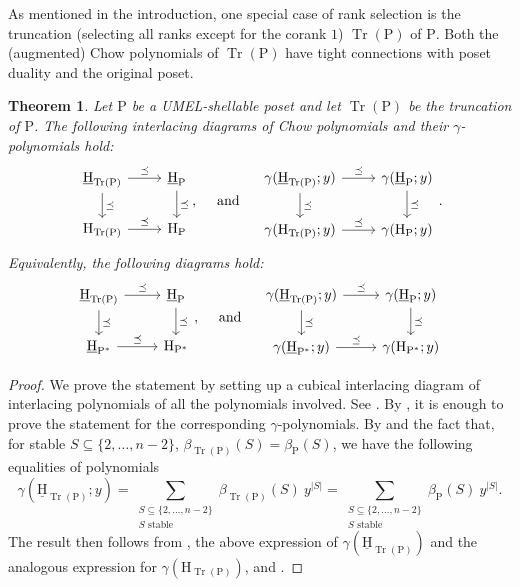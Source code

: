 \documentclass[11pt,a4paper]{amsart}
\theoremstyle{results}
\newtheorem{thm}{Theorem}[section]
\theoremstyle{definitions}
\def\P{\mathbb{P}}
\newcommand{\abs}[1]{\left\lvert#1\right\rvert}
\newcommand{\uH}{\underline{\mathrm{H}}}
\newcommand{\Tr}{\operatorname{Tr}}
\renewcommand{\P}{\mathrm{P}}
\renewcommand{\H}{\mathrm{H}}
\begin{document}
As mentioned in the introduction, one special case of rank selection is the truncation (selecting all ranks except for the corank $1$) $\Tr(\P)$ of $\P$. Both the (augmented) Chow polynomials of $\Tr(\P)$ have tight connections with poset duality and the original poset.
\begin{thm}\label{thm:gamma-truncation-interlacing}
    Let $\P$ be a UMEL-shellable poset and let $\Tr(\P)$ be the truncation of $\P$. 
    The following interlacing diagrams of Chow polynomials and their $\gamma$-polynomials hold: 
    \[
    \begin{tikzcd}
    \uH_{\Tr(\P)} \arrow[r, "\preceq"] \arrow[d, "\preceq"] & \uH_{\P} \arrow[d, "\preceq"] \\
     \H_{\Tr(\P)} \arrow[r, "\preceq"] & \H_{\P}
    \end{tikzcd}, \quad \text{ and } \quad \begin{tikzcd}
    \gamma(\uH_{\Tr(\P)}; y) \arrow[r, "\preceq"] \arrow[d, "\preceq"] & \gamma(\uH_{\P}; y) \arrow[d, "\preceq"] \\
     \gamma(\H_{\Tr(\P)}; y) \arrow[r, "\preceq"] & \gamma(\H_{\P}; y)
    \end{tikzcd}.
    \]
    Equivalently, the following diagrams hold: 
    \[
    \begin{tikzcd}
    \uH_{\Tr(\P)} \arrow[r, "\preceq"] \arrow[d, "\preceq"] & \uH_{\P} \arrow[d, "\preceq"] \\
    \uH_{\P^{\ast}} \arrow[r, "\preceq"] & \H_{\P^{\ast}}
    \end{tikzcd}, \quad \text{ and } \quad 
    \begin{tikzcd}
    \gamma(\uH_{\Tr(\P)}; y) \arrow[r, "\preceq"] \arrow[d, "\preceq"] & \gamma(\uH_{\P};y) \arrow[d, "\preceq"] \\
    \gamma(\uH_{\P^{\ast}};y) \arrow[r, "\preceq"] & \gamma(\H_{\P^{\ast}};y)
    \end{tikzcd}
    \]
\end{thm}

\begin{proof}
    We prove the statement by setting up a cubical interlacing diagram of interlacing polynomials of all the polynomials involved. See . By , it is enough to prove the statement for the corresponding $\gamma$-polynomials. 
    By  and the fact that, for stable $S \subseteq \{2, \ldots, n-2\}$, $\beta_{\Tr(\P)}(S) = \beta_{\P}(S)$, we have the following equalities of polynomials 
    \[
    \gamma(\uH_{\Tr(\P)}; y) = \sum_{\substack{S \subseteq \{2, \ldots, n-2\}\\ S \text{ stable}}} \beta_{\Tr(\P)}(S) \: y^{\abs{S}} = \sum_{\substack{S \subseteq \{2, \ldots, n-2\}\\ S \text{ stable}}} \beta_{\P}(S) \: y^{\abs{S}}.
    \]
    The result then follows from , the above expression of $\gamma(\uH_{\Tr(\P)})$ and the analogous expression for $\gamma(\H_{\Tr(\P)})$, and . 
\end{proof}
\end{document}
